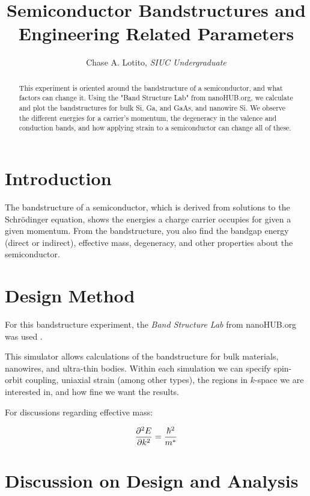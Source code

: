 \documentclass{IEEEtran}
\title{Semiconductor Bandstructures and Engineering Related Parameters}
\author{Chase A. Lotito, \textit{SIUC Undergraduate}}
\date{}
\begin{document}
\maketitle %

\begin{abstract}
    This experiment is oriented around the bandstructure of a semiconductor, and what factors can change it. Using the "Band Structure Lab" from nanoHUB.org, we calculate and plot the bandstructures for bulk Si, Ga, and GaAs, and nanowire Si. We observe the different energies for a carrier's momentum, the degeneracy in the valence and conduction bands, and how applying strain to a semiconductor can change all of these.
\end{abstract}

\section{Introduction}

The bandstructure of a semiconductor, which is derived from solutions to the Schr\"{o}dinger equation, shows the energies a charge carrier occupies for given a given momentum. From the bandstructure, you also find the bandgap energy (direct or indirect), effective mass, degeneracy, and other properties about the semiconductor.

\section{Design Method}
For this bandstructure experiment, the \textit{Band Structure Lab} from nanoHUB.org was used \cite{sim}.

This simulator allows calculations of the bandstructure for bulk materials, nanowires, and ultra-thin bodies. Within each simulation we can specify spin-orbit coupling, uniaxial strain (among other types), the regions in \(k\)-space we are interested in, and how fine we want the results.

For discussions regarding effective mass:

\begin{equation}\label{eq:curvature-effective-mass}
    \pdv[2]{E}{k} = \frac{\hbar^2}{m^*}
\end{equation}

\section{Discussion on Design and Analysis}
\end{document}
